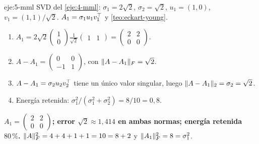 \begin{solucion}{eje:5-mml}
\datos SVD del \cref{eje:4-mml}: $\sigma_1=2\sqrt{2}$, $\sigma_2=\sqrt{2}$, $u_1=(1,0)$, $v_1=(1,1)/\sqrt{2}$.
\planteamiento $A_1=\sigma_1u_1v_1^{\top}$ y \cref{teo:eckart-young}.
\pasos
\begin{enumerate}[label=\arabic*.]
  \item $A_1=2\sqrt{2}\begin{pmatrix}1\\0\end{pmatrix}\frac{1}{\sqrt{2}}\begin{pmatrix}1&1\end{pmatrix}=\begin{pmatrix}2&2\\0&0\end{pmatrix}$.
  \item $A-A_1=\begin{pmatrix}0&0\\-1&1\end{pmatrix}$, con $\lVert A-A_1\rVert_F=\sqrt{2}$.
  \item $A-A_1=\sigma_2u_2v_2^{\top}$ tiene un único valor singular, luego $\lVert A-A_1\rVert_2=\sigma_2=\sqrt{2}$.
  \item Energía retenida: $\sigma_1^{2}/(\sigma_1^{2}+\sigma_2^{2})=8/10=0{,}8$.
\end{enumerate}
\resultado \textbf{$A_1=\begin{pmatrix}2&2\\0&0\end{pmatrix}$; error $\sqrt{2}\approx 1{,}414$ en ambas normas; energía retenida $80\,\%$.}
\comprobacion $\lVert A\rVert_F^{2}=4+4+1+1=10=8+2$ y $\lVert A_1\rVert_F^{2}=8=\sigma_1^{2}$.
\end{solucion}

